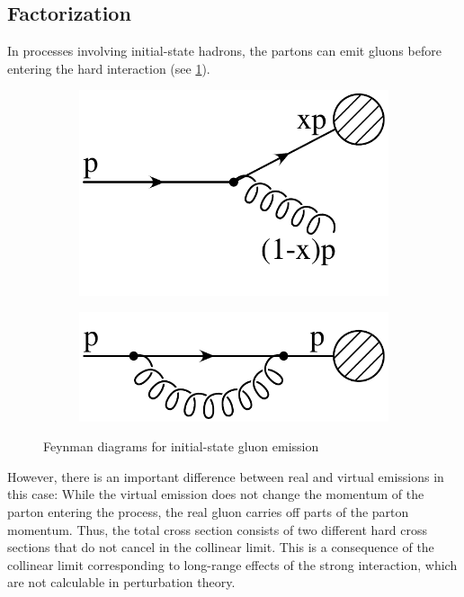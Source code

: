 \subsection{Factorization}
In processes involving initial-state hadrons, the partons can emit gluons before entering the hard interaction (see \cref{fig:initial_gluon}).
%
\begin{figure}
\centering
	\begin{subfigure}[]{0.3\textwidth}
		\includegraphics[width=\textwidth]{images/initial_real.pdf}
	\end{subfigure}
	\hspace{1cm}
	\begin{subfigure}[]{0.3\textwidth}
		\includegraphics[width=\textwidth]{images/initial_virtual.pdf}
	\end{subfigure}
	\caption{Feynman diagrams for initial-state gluon emission}
	\label{fig:initial_gluon}
\end{figure}
%
However, there is an important difference between real and virtual emissions in this case:
While the virtual emission does not change the momentum of the parton entering the process, the real gluon carries off parts of the parton momentum.
Thus, the total cross section consists of two different hard cross sections that do not cancel in the collinear limit.
This is a consequence of the collinear limit corresponding to long-range effects of the strong interaction, which are not calculable in perturbation theory.

